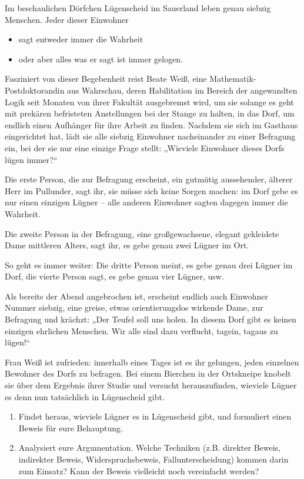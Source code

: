 \begin{aufg}
    Im beschaulichen Dörfchen Lügenscheid im Sauerland leben genau siebzig Menschen. Jeder dieser Einwohner 
    \begin{itemize}
        \item sagt entweder immer die Wahrheit
        \item oder aber alles was er sagt ist immer gelogen.
    \end{itemize}
    Fasziniert von dieser Begebenheit reist Beate Weiß, eine Mathematik-Postdoktorandin aus Wahrschau, deren Habilitation im Bereich der angewandten Logik seit Monaten von ihrer Fakultät ausgebremst wird, um sie solange es geht mit prekären befristeten Anstellungen bei der Stange zu halten, in das Dorf, um endlich einen Aufhänger für ihre Arbeit zu finden. Nachdem sie sich im Gasthaus eingerichtet hat, lädt sie alle siebzig Einwohner nacheinander zu einer Befragung ein, bei der sie nur eine einzige Frage stellt: „Wieviele Einwohner dieses Dorfs lügen immer?“
    
    Die erste Person, die zur Befragung erscheint, ein gutmütig aussehender, älterer Herr im Pullunder, sagt ihr, sie müsse sich keine Sorgen machen: im Dorf gebe es nur einen einzigen Lügner -- alle anderen Einwohner sagten dagegen immer die Wahrheit.
    
    Die zweite Person in der Befragung, eine großgewachsene, elegant gekleidete Dame mittleren Alters, sagt ihr, es gebe genau zwei Lügner im Ort.
    
    So geht es immer weiter: Die dritte Person meint, es gebe genau drei Lügner im Dorf, die vierte Person sagt, es gebe genau vier Lügner, usw.
    
    Als bereits der Abend angebrochen ist, erscheint endlich auch Einwohner Nummer siebzig, eine greise, etwas orientierungslos wirkende Dame, zur Befragung und krächzt: „Der Teufel soll uns holen. In diesem Dorf gibt es keinen einzigen ehrlichen Menschen. Wir alle sind dazu verflucht, tagein, tagaus zu lügen!“
    
    Frau Weiß ist zufrieden: innerhalb eines Tages ist es ihr gelungen, jeden einzelnen Bewohner des Dorfs zu befragen. Bei einem Bierchen in der Ortskneipe knobelt sie über dem Ergebnis ihrer Studie und versucht herauszufinden, wieviele Lügner es denn nun tatsächlich in Lügenscheid gibt.
    \begin{enumerate}
        \item Findet heraus, wieviele Lügner es in Lügenscheid gibt, und formuliert einen Beweis für eure Behauptung.
        \item Analysiert eure Argumentation. Welche Techniken (z.B. direkter Beweis, indirekter Beweis, Widerspruchsbeweis, Fallunterscheidung) kommen darin zum Einsatz? Kann der Beweis vielleicht noch vereinfacht werden?
    \end{enumerate}
\end{aufg}

